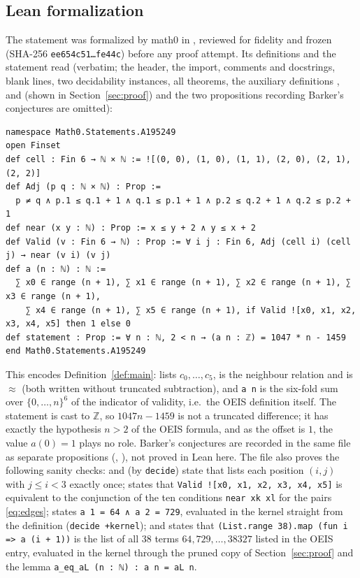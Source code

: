 \documentclass[11pt]{amsart}
\theoremstyle{plain}
\theoremstyle{definition}
\newcommand{\Z}{\mathbb{Z}}
\newcommand{\nr}{\approx}
\begin{document}
\subsection*{Lean formalization}
The statement was formalized by math0 in , reviewed for fidelity and frozen (SHA-256 \texttt{ee654c51\ldots fe44c}) before any proof attempt. Its definitions and the statement read (verbatim; the header, the import, comments and docstrings, blank lines, two decidability instances, all theorems, the auxiliary definitions ,  and  (shown in Section~\ref{sec:proof}) and the two propositions recording Barker's conjectures are omitted):
\begin{lstlisting}[basicstyle=\ttfamily\scriptsize]
namespace Math0.Statements.A195249
open Finset
def cell : Fin 6 → ℕ × ℕ := ![(0, 0), (1, 0), (1, 1), (2, 0), (2, 1), (2, 2)]
def Adj (p q : ℕ × ℕ) : Prop :=
  p ≠ q ∧ p.1 ≤ q.1 + 1 ∧ q.1 ≤ p.1 + 1 ∧ p.2 ≤ q.2 + 1 ∧ q.2 ≤ p.2 + 1
def near (x y : ℕ) : Prop := x ≤ y + 2 ∧ y ≤ x + 2
def Valid (v : Fin 6 → ℕ) : Prop := ∀ i j : Fin 6, Adj (cell i) (cell j) → near (v i) (v j)
def a (n : ℕ) : ℕ :=
  ∑ x0 ∈ range (n + 1), ∑ x1 ∈ range (n + 1), ∑ x2 ∈ range (n + 1), ∑ x3 ∈ range (n + 1),
    ∑ x4 ∈ range (n + 1), ∑ x5 ∈ range (n + 1), if Valid ![x0, x1, x2, x3, x4, x5] then 1 else 0
def statement : Prop := ∀ n : ℕ, 2 < n → (a n : ℤ) = 1047 * n - 1459
end Math0.Statements.A195249
\end{lstlisting}
This encodes Definition~\ref{def:main}:  lists $c_0,\dots,c_5$,  is the neighbour relation and  is $\nr$ (both written without truncated subtraction), and \texttt{a n} is the six-fold sum over $\{0,\dots,n\}^6$ of the indicator of validity, i.e.\ the OEIS definition itself. The statement is cast to $\Z$, so $1047n-1459$ is not a truncated difference; it has exactly the hypothesis $n>2$ of the OEIS formula, and as the offset is $1$, the value $a(0)=1$ plays no role. Barker's conjectures are recorded in the same file as separate propositions (, ), not proved in Lean here.
The file also proves the following sanity checks:  and  (by \texttt{decide}) state that  lists each position $(i,j)$ with $j\le i<3$ exactly once;  states that \texttt{Valid ![x0, x1, x2, x3, x4, x5]} is equivalent to the conjunction of the ten conditions \texttt{near xk xl} for the pairs \eqref{eq:edges};  states \texttt{a 1 = 64 ∧ a 2 = 729}, evaluated in the kernel straight from the definition (\texttt{decide +kernel}); and  states that \texttt{(List.range 38).map (fun i => a (i + 1))} is the list of all $38$ terms $64,729,\dots,38327$ listed in the OEIS entry, evaluated in the kernel through the pruned copy  of Section~\ref{sec:proof} and the lemma \texttt{a\_eq\_aL (n : ℕ) : a n = aL n}.
\end{document}
